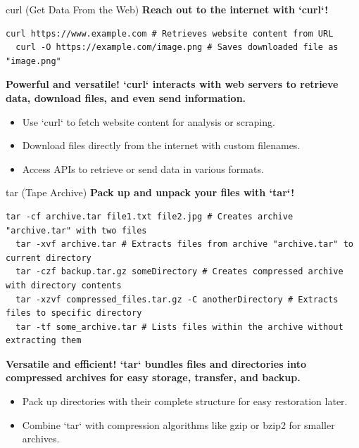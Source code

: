 \documentclass{beamer}
\begin{document}
\begin{frame}[fragile]{curl (Get Data From the Web)}
  \textbf{Reach out to the internet with `curl`!}

  \begin{lstlisting}[frame=none]
  curl https://www.example.com # Retrieves website content from URL
  curl -O https://example.com/image.png # Saves downloaded file as "image.png"
  \end{lstlisting}

  \textbf{Powerful and versatile! `curl` interacts with web servers to retrieve data, download files, and even send information.}

  \begin{itemize}
    \item Use `curl` to fetch website content for analysis or scraping.
    \item Download files directly from the internet with custom filenames.
    \item Access APIs to retrieve or send data in various formats.
  \end{itemize}

\end{frame}

\begin{frame}[fragile]{tar (Tape Archive)}
  \textbf{Pack up and unpack your files with `tar`!}

  \begin{lstlisting}[frame=none]
  tar -cf archive.tar file1.txt file2.jpg # Creates archive "archive.tar" with two files
  tar -xvf archive.tar # Extracts files from archive "archive.tar" to current directory
  tar -czf backup.tar.gz someDirectory # Creates compressed archive with directory contents
  tar -xzvf compressed_files.tar.gz -C anotherDirectory # Extracts files to specific directory
  tar -tf some_archive.tar # Lists files within the archive without extracting them
  \end{lstlisting}

  \textbf{Versatile and efficient! `tar` bundles files and directories into compressed archives for easy storage, transfer, and backup.}

  \begin{itemize}
    \item Pack up directories with their complete structure for easy restoration later.
    \item Combine `tar` with compression algorithms like gzip or bzip2 for smaller archives.
  \end{itemize}
\end{frame}
\end{document}
